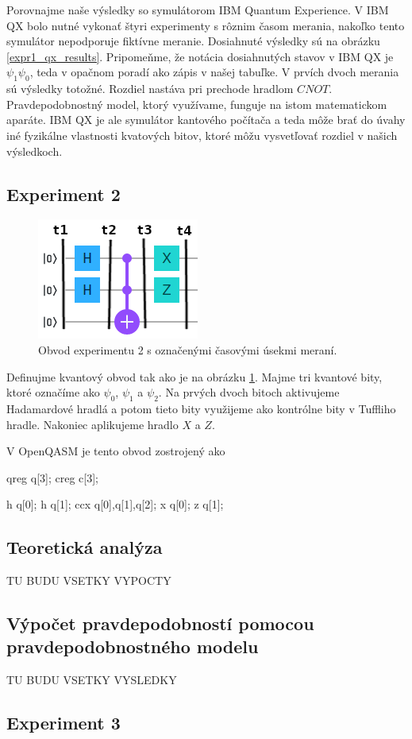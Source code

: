 Porovnajme naše výsledky so symulátorom IBM Quantum Experience. V IBM QX
bolo nutné vykonať štyri experimenty s rôznim časom merania, nakoľko tento
symulátor nepodporuje fiktívne meranie. Dosiahnuté výsledky sú na obrázku
\ref{expr1_qx_results}. Pripomeňme, že notácia dosiahnutých stavov v IBM QX
je \(\psi_1\psi_0\), teda v opačnom poradí ako zápis v našej tabuľke. V 
prvích dvoch merania sú výsledky totožné. Rozdiel nastáva pri prechode hradlom
\(CNOT\). Pravdepodobnostný model, ktorý využívame, funguje na istom 
matematickom aparáte. IBM QX je ale symulátor kantového počítača a teda môže 
brať do úvahy iné fyzikálne vlastnosti kvatových bitov, ktoré môžu vysvetľovať
rozdiel v našich výsledkoch.

\subsection{Experiment 2}
\begin{figure} 
	\centering 
	\includegraphics[width=.5\textwidth]{figures/expr2_circuit.png} 
	\caption{Obvod experimentu 2 s označenými časovými úsekmi meraní.}

    \label{expr2_circuit}
\end{figure}

Definujme kvantový obvod tak ako je na obrázku \ref{expr2_circuit}. Majme 
tri kvantové bity, ktoré označíme ako \(\psi_0\), \(\psi_1\) a \(\psi_2\).
Na prvých dvoch bitoch aktivujeme Hadamardové hradlá a potom tieto bity 
využijeme ako kontrólne bity v Tuffliho hradle. Nakoniec aplikujeme hradlo 
\(X\) a \(Z\).

V OpenQASM je tento obvod zostrojený ako
\begin{code}
qreg q[3];
creg c[3];

h q[0];
h q[1];
ccx q[0],q[1],q[2];
x q[0];
z q[1];
\end{code}

\subsection*{Teoretická analýza}
TU BUDU VSETKY VYPOCTY

\subsection*{Výpočet pravdepodobností pomocou pravdepodobnostného modelu}
TU BUDU VSETKY VYSLEDKY

\subsection{Experiment 3}
